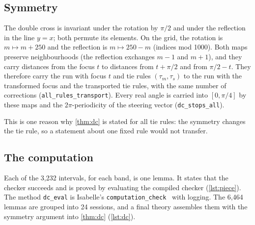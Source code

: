 \documentclass[11pt]{amsart}
\theoremstyle{plain}
\theoremstyle{definition}
\newcommand{\thy}[1]{\texttt{#1}}
\begin{document}



\subsection{Symmetry}\label{sec:symmetry}

The double cross is invariant under the rotation by $\pi/2$ and under the reflection in the line
$y = x$; both permute its elements.  On the grid, the rotation is $m \mapsto m + 250$ and the
reflection is $m \mapsto 250 - m$ (indices mod 1000).  Both maps preserve neighbourhoods (the
reflection exchanges $m - 1$ and $m + 1$), and they carry distances from the focus $t$ to distances
from $t + \pi/2$ and from $\pi/2 - t$.  They therefore carry the run with focus $t$ and tie rules
$(\tau_m, \tau_s)$ to the run with the transformed focus and the transported tie rules, with the same
number of corrections (\thy{all\_rules\_transport}).  Every real angle is carried into $[0, \pi/4]$ by
these maps and the $2\pi$-periodicity of the steering vector (\thy{dc\_stops\_all}).

This is one reason why \cref{thm:dc} is stated for all tie rules: the symmetry changes the tie rule,
so a statement about one fixed rule would not transfer.





\subsection{The computation}\label{sec:computation}

Each of the 3{,}232 intervals, for each band, is one lemma.  It states that the checker succeeds and
is proved by evaluating the compiled checker (\cref{lst:piece}).  The method \thy{dc\_eval} is
Isabelle's \thy{computation\_check}~\cite{HaftmannN10} with logging.  The 6{,}464 lemmas are grouped
into 24 sessions, and a final theory assembles them with the symmetry argument into \cref{thm:dc}
(\cref{lst:dc}).
\end{document}

